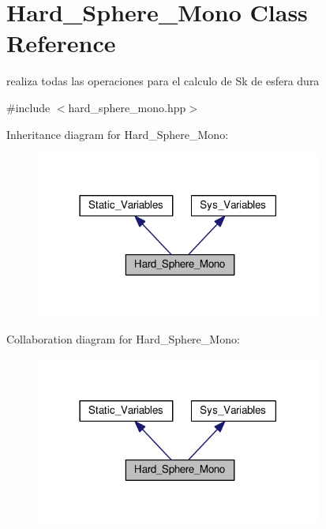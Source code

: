 \hypertarget{class_hard___sphere___mono}{}\section{Hard\+\_\+\+Sphere\+\_\+\+Mono Class Reference}
\label{class_hard___sphere___mono}


realiza todas las operaciones para el calculo de Sk de esfera dura  




{\ttfamily \#include $<$hard\+\_\+sphere\+\_\+mono.\+hpp$>$}



Inheritance diagram for Hard\+\_\+\+Sphere\+\_\+\+Mono\+:\nopagebreak
\begin{figure}[H]
\begin{center}
\leavevmode
\includegraphics[width=266pt]{class_hard___sphere___mono__inherit__graph}
\end{center}
\end{figure}


Collaboration diagram for Hard\+\_\+\+Sphere\+\_\+\+Mono\+:\nopagebreak
\begin{figure}[H]
\begin{center}
\leavevmode
\includegraphics[width=266pt]{class_hard___sphere___mono__coll__graph}
\end{center}
\end{figure}
